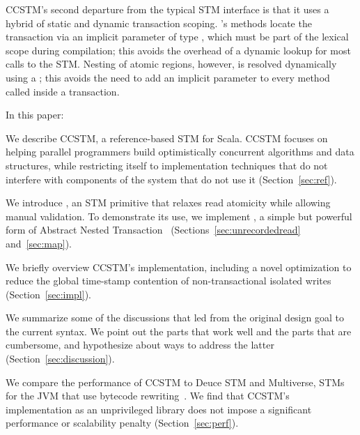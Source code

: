 
CCSTM's second departure from the typical STM interface is that it uses a
hybrid of static and dynamic transaction scoping.  's methods
locate the transaction via an implicit parameter of type ,
which must be part of the lexical scope during compilation; this
avoids the overhead of a dynamic lookup for most calls to the STM.
Nesting of atomic regions, however, is resolved dynamically using a
; this avoids the need to add an implicit 
parameter to every method called inside a transaction.


In this paper:
\begin{packed_enum}

\item We describe CCSTM, a reference-based STM for Scala.  CCSTM focuses
on helping parallel programmers build optimistically concurrent algorithms
and data structures, while restricting itself to implementation techniques
that do not interfere with components of the system that do not use it
(Section~\ref{sec:ref}).

\item We introduce , an STM primitive that relaxes
read atomicity while allowing manual validation.  To demonstrate its
use, we implement , a simple but powerful form of
Abstract Nested Transaction~\cite{harris07abstract}
(Sections~\ref{sec:unrecordedread}
and~\ref{sec:map}).

\item We briefly overview CCSTM's implementation, including a
novel optimization to reduce the global time-stamp contention of
non-transactional isolated writes (Section~\ref{sec:impl}).

\item We summarize some of the discussions that led from the original
design goal to the current syntax.  We point out the parts that work
well and the parts that are cumbersome, and hypothesize about ways to
address the latter (Section~\ref{sec:discussion}).

\item We compare the performance of CCSTM to Deuce STM and Multiverse,
STMs for the JVM that use bytecode rewriting~\cite{deucestm,multiverse}.
We find that CCSTM's implementation as an unprivileged library
does not impose a significant performance or scalability penalty
(Section~\ref{sec:perf}).

\end{packed_enum}

